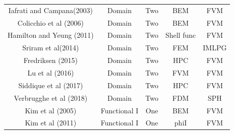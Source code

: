 \documentclass[preprint,12pt]{article}
\begin{document}
{\begin{table}[]
\begin{tabular}{ccccc}
Iafrati and Campana(2003) \cite{Iafrati2003}                                                             & Domain                 & Two                                                              & BEM                   & FVM                  \\
Colicchio et al (2006) \cite{Colicchio2006}                                                                & Domain                 & Two                                                              & BEM                   & FVM                  \\
Hamilton and Yeung (2011) \cite{Hamilton2011}                                                             & Domain                 & Two                                                              & Shell func            & FVM                  \\
Sriram et al(2014) \cite{Sriram2014}                                                                   & Domain                 & Two                                                              & FEM                   & IMLPG                \\
Fredriksen (2015)\cite{Fredriksen2015}                                                                    & Domain                 & Two                                                              & HPC                   & FVM                  \\
Lu et al (2016) \cite{Lu2016}                                                                      & Domain                 & Two                                                              & FVM                   & FVM                  \\
Siddique et al (2017)\cite{Siddiqui2017}                                                                 & Domain                 & Two                                                              & HPC                   & FVM                  \\
Verbrugghe et al (2018) \cite{Verbrugghe2018}                                                               & Domain                 & Two                                                              & FDM                   & SPH                  \\ \hline
Kim et al (2005) \cite{Kim2005}                                                                     & Functional I           & One                                                              & BEM                   & FVM                  \\
Kim et al (2011) \cite{Kim2005a}                                                                     & Functional I           & One                                                              & phiI                  & FVM                  \\

\end{tabular}
\end{table}}
\end{document}
